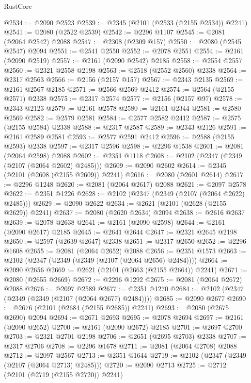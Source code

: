 \begin{lexlean}{RustCore}
\begin{coremodule}
@2534 := @2090 @2523
@2539 := @2345 (@2101 (@2533 (@2155 @2534)) @2241)
@2541 := @2080 (@2522 @2539)
@2542 := @2296 @1107
@2545 := @2081 (@2064 @2542) @2088
@2547 := @2308 (@2309 @157)
@2550 := @2080 (@2545 @2547) @2094
@2551 := @2541 @2550
@2552 := @2078 @2551
@2554 := @2161 (@2090 @2519)
@2557 := @2161 (@2090 @2542) @2185
@2558 := @2554 @2557
@2560 := @2321 @2558 @2198
@2563 := @2518 (@2552 @2560) @2338
@2564 := @2317 @2563
@2566 := @2156 (@2157 @157)
@2567 := @2343 @2135
@2569 := @2161 @2567 @2185
@2571 := @2566 @2569 @2412
@2574 := @2564 (@2155 @2571) @2338
@2575 := @2317 @2574
@2577 := @2156 (@2157 @97)
@2578 := @2343 @2123
@2579 := @2161 @2578
@2580 := @2161 @2344
@2581 := @2580 @2569
@2582 := @2579 @2581
@2584 := @2577 @2582 @2412
@2587 := @2575 (@2155 @2584) @2338
@2588 := @2317 @2587
@2589 := @2343 @2126
@2591 := @2161 @2589 @2581
@2593 := @2577 @2591 @2412
@2596 := @2588 (@2155 @2593) @2338
@2597 := @2317 @2596
@2598 := @2296 @1538
@2601 := @2081 (@2064 @2598) @2088
@2602 := @2351 @1118
@2608 := @2102 (@2347 (@2349 (@2107 (@2064 @2602) @2485)))
@2609 := @2090 @2602
@2614 := @2345 (@2101 (@2608 (@2155 @2609)) @2241)
@2616 := @2080 (@2601 @2614)
@2617 := @2296 @1248
@2620 := @2081 (@2064 @2617) @2088
@2621 := @2097 @2578
@2622 := @2351 @1226
@2628 := @2102 (@2347 (@2349 (@2107 (@2064 @2622) @2485)))
@2629 := @2090 @2622
@2634 := @2621 (@2101 (@2628 (@2155 @2629)) @2241)
@2637 := @2080 (@2620 @2634) @2094
@2638 := @2616 @2637
@2639 := @2078 @2638
@2641 := @2161 (@2090 @2598)
@2644 := @2161 (@2090 @2617) @2185
@2645 := @2641 @2644
@2647 := @2321 @2645 @2198
@2650 := @2597 (@2639 @2647) @2338
@2651 := @2317 @2650
@2652 := @2296 @1608
@2655 := @2081 (@2064 @2652) @2088
@2656 := @2351 @1573
@2663 := @2102 (@2347 (@2349 (@2349 (@2107 (@2064 @2656) @2484))))
@2664 := @2090 @2656
@2669 := @2621 (@2101 (@2663 (@2155 @2664)) @2241)
@2671 := @2080 (@2655 @2669)
@2672 := @2296 @1292
@2675 := @2081 (@2064 @2672) @2088
@2676 := @2097 @2589
@2677 := @2351 @1270
@2684 := @2102 (@2347 (@2349 (@2349 (@2107 (@2064 @2677) @2484))))
@2685 := @2090 @2677
@2690 := @2676 (@2101 (@2684 (@2155 @2685)) @2241)
@2693 := @2080 (@2675 @2690) @2094
@2694 := @2671 @2693
@2695 := @2078 @2694
@2697 := @2161 (@2090 @2652)
@2700 := @2161 (@2090 @2672) @2185
@2701 := @2697 @2700
@2703 := @2321 @2701 @2198
@2706 := @2651 (@2695 @2703) @2338
@2707 := @2317 @2706
@2708 := @2296 @1678
@2711 := @2081 (@2064 @2708) @2088
@2712 := @2097 @2567
@2713 := @2351 @1644
@2719 := @2102 (@2347 (@2349 (@2107 (@2064 @2713) @2485)))
@2720 := @2090 @2713
@2725 := @2712 (@2101 (@2719 (@2155 @2720)) @2241)

\end{coremodule}
\end{lexlean}
